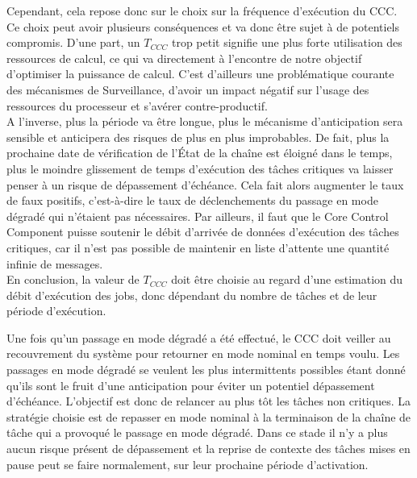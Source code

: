 \documentclass[french, a4paper, 11pt, twoside, pdftex]{StyleThese}
\begin{document}
        Cependant, cela repose donc sur le choix sur la fréquence d'exécution du CCC. Ce choix peut avoir plusieurs conséquences et va donc être sujet à de potentiels compromis. D'une part, un $T_{CCC}$ trop petit signifie une plus forte utilisation des ressources de calcul, ce qui va directement à l'encontre de notre objectif d'optimiser la puissance de calcul. C'est d'ailleurs une problématique courante des mécanismes de Surveillance, d'avoir un impact négatif sur l'usage des ressources du processeur et s'avérer contre-productif. \\
        A l'inverse, plus la période va être longue, plus le mécanisme d'anticipation sera sensible et anticipera des risques de plus en plus improbables. De fait, plus la prochaine date de vérification de l'État de la chaîne est éloigné dans le temps, plus le moindre glissement de temps d'exécution des tâches critiques va laisser penser à un risque de dépassement d'échéance. Cela fait alors augmenter le taux de faux positifs, c'est-à-dire le taux de déclenchements du passage en mode dégradé qui n'étaient pas nécessaires. Par ailleurs, il faut que le Core Control Component puisse soutenir le débit d'arrivée de données d'exécution des tâches critiques, car il n'est pas possible de maintenir en liste d'attente une quantité infinie de messages. \\
        En conclusion, la valeur de $T_{CCC}$ doit être choisie au regard d'une estimation du débit d'exécution des jobs, donc dépendant du nombre de tâches et de leur période d'exécution. 
        
		Une fois qu'un passage en mode dégradé a été effectué, le CCC doit veiller au recouvrement du système pour retourner en mode nominal en temps voulu. Les passages en mode dégradé se veulent les plus intermittents possibles étant donné qu'ils sont le fruit d'une anticipation pour éviter un potentiel dépassement d'échéance. L'objectif est donc de relancer au plus tôt les tâches non critiques. La stratégie choisie est de repasser en mode nominal à la terminaison de la chaîne de tâche qui a provoqué le passage en mode dégradé. Dans ce stade il n'y a plus aucun risque présent de dépassement et la reprise de contexte des tâches mises en pause peut se faire normalement, sur leur prochaine période d'activation. 
		
            
\end{document}
